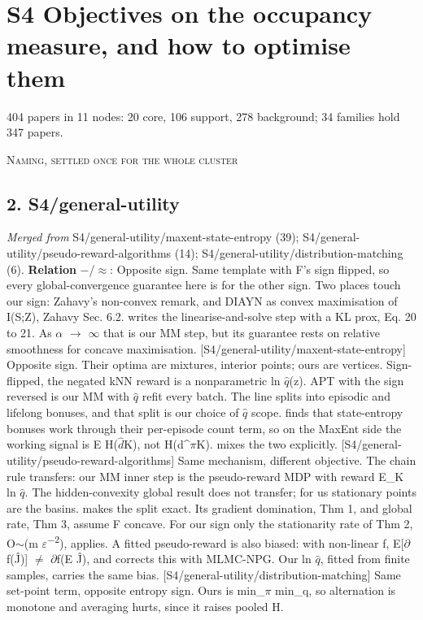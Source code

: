 \documentclass[10pt]{article}
\begin{document}
\section{S4 Objectives on the occupancy measure, and how to optimise them}
404 papers in 11 nodes: 20 core, 106 support, 278 background; 34 families hold 347 papers.

\medskip\textsc{Naming, settled once for the whole cluster}

\subsection{2. S4/general-utility}\label{node:S4-S4-general-utility}
\textit{Merged from} S4/general-utility/maxent-state-entropy (39); S4/general-utility/pseudo-reward-algorithms (14); S4/general-utility/distribution-matching (6). \textbf{Relation} $-$/$\approx$: Opposite sign. Same template with F's sign flipped, so every global-convergence guarantee here is for the other sign. Two places touch our sign: Zahavy's non-convex remark, and DIAYN as convex maximisation of I(S;Z), Zahavy Sec. 6.2. \citet{Milosevic-dually26} writes the linearise-and-solve step with a KL prox, Eq. 20 to 21. As \ensuremath{\alpha} \ensuremath{\to} \ensuremath{\infty} that is our MM step, but its guarantee rests on relative smoothness for concave maximisation. [S4/general-utility/maxent-state-entropy] Opposite sign. Their optima are mixtures, interior points; ours are vertices. Sign-flipped, the negated kNN reward is a nonparametric ln \ensuremath{\hat{q}}(z). APT with the sign reversed is our MM with \ensuremath{\hat{q}} refit every batch. The line splits into episodic and lifelong bonuses, and that split is our choice of \ensuremath{\hat{q}} scope. \citet{Henaff-exploration22} finds that state-entropy bonuses work through their per-episode count term, so on the MaxEnt side the working signal is E H(\ensuremath{\hat{d}}K), not H(d\^{}\ensuremath{\pi}K). \citet{Li-element24} mixes the two explicitly. [S4/general-utility/pseudo-reward-algorithms] Same mechanism, different objective. The chain rule transfers: our MM inner step is the pseudo-reward MDP with reward E\_K ln \ensuremath{\hat{q}}. The hidden-convexity global result does not transfer; for us stationary points are the basins. \citet{Barakat-global25} makes the split exact. Its gradient domination, Thm 1, and global rate, Thm 3, assume F concave. For our sign only the stationarity rate of Thm 2, O\ensuremath{\sim}(m \ensuremath{\varepsilon}\textsuperscript{$-$}\textsuperscript{2}), applies. A fitted pseudo-reward is also biased: with non-linear f, E[\ensuremath{\partial}f(\^J)] \ensuremath{\neq} \ensuremath{\partial}f(E \^J), and \citet{Ganesh-breaking26} corrects this with MLMC-NPG. Our ln \ensuremath{\hat{q}}, fitted from finite samples, carries the same bias. [S4/general-utility/distribution-matching] Same set-point term, opposite entropy sign. Ours is min\_\ensuremath{\pi} min\_q, so alternation is monotone and averaging hurts, since it raises pooled H.
\end{document}
